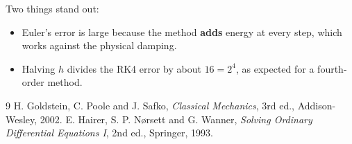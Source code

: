 \documentclass[11pt,a4paper]{article}
\begin{document}
Two things stand out:
\begin{itemize}
  \item Euler's error is large because the method \textbf{adds} energy at every step, which works against the physical damping.
  \item Halving $h$ divides the RK4 error by about $16=2^{4}$, as expected for a fourth-order method.
\end{itemize}

\begin{thebibliography}{9}
 H. Goldstein, C. Poole and J. Safko, \emph{Classical Mechanics}, 3rd ed., Addison-Wesley, 2002.
 E. Hairer, S. P. Nørsett and G. Wanner, \emph{Solving Ordinary Differential Equations I}, 2nd ed., Springer, 1993.
\end{thebibliography}
\end{document}
